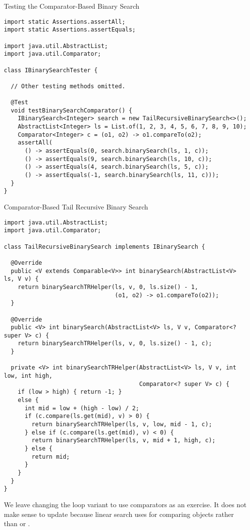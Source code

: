 \begin{cl}[]{Testing the Comparator-Based Binary Search}
\begin{lstlisting}[language=MyJava]
import static Assertions.assertAll;
import static Assertions.assertEquals;

import java.util.AbstractList;
import java.util.Comparator;

class IBinarySearchTester {

  // Other testing methods omitted.

  @Test
  void testBinarySearchComparator() {
    IBinarySearch<Integer> search = new TailRecursiveBinarySearch<>();
    AbstractList<Integer> ls = List.of(1, 2, 3, 4, 5, 6, 7, 8, 9, 10);
    Comparator<Integer> c = (o1, o2) -> o1.compareTo(o2);
    assertAll(
      () -> assertEquals(0, search.binarySearch(ls, 1, c));
      () -> assertEquals(9, search.binarySearch(ls, 10, c));
      () -> assertEquals(4, search.binarySearch(ls, 5, c));
      () -> assertEquals(-1, search.binarySearch(ls, 11, c)));
  }
}
\end{lstlisting}
\end{cl}

\begin{cl}[]{Comparator-Based Tail Recursive Binary Search}
\begin{lstlisting}[language=MyJava]
import java.util.AbstractList;
import java.util.Comparator;

class TailRecursiveBinarySearch implements IBinarySearch {
  
  @Override
  public <V extends Comparable<V>> int binarySearch(AbstractList<V> ls, V v) {
    return binarySearchTRHelper(ls, v, 0, ls.size() - 1,
                                (o1, o2) -> o1.compareTo(o2));
  }
  
  @Override
  public <V> int binarySearch(AbstractList<V> ls, V v, Comparator<? super V> c) {
    return binarySearchTRHelper(ls, v, 0, ls.size() - 1, c);
  }
  
  private <V> int binarySearchTRHelper(AbstractList<V> ls, V v, int low, int high,
                                       Comparator<? super V> c) {
    if (low > high) { return -1; } 
    else {
      int mid = low + (high - low) / 2;
      if (c.compare(ls.get(mid), v) > 0) { 
        return binarySearchTRHelper(ls, v, low, mid - 1, c); 
      } else if (c.compare(ls.get(mid), v) < 0) { 
        return binarySearchTRHelper(ls, v, mid + 1, high, c); 
      } else { 
        return mid; 
      }
    }
  }
}
\end{lstlisting}
\end{cl}

We leave changing the loop variant to use comparators as an exercise. It does not make sense to update  because linear search uses  for comparing objects rather than  or .